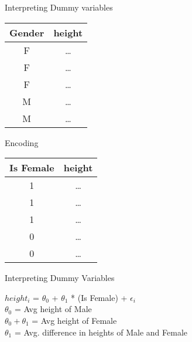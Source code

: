 \documentclass{beamer}
\begin{document}
\begin{frame}{Interpreting Dummy variables}
\begin{center}
\begin{tabular}{c|c}
Gender& height\\
\hline
\hline
F & \dots \\
F & \dots \\
F & \dots \\
M & \dots \\
M & \dots \\
\end{tabular}

\end{center}

\pause Encoding

\begin{center}
\pause \begin{tabular}{c|c}
Is Female& height\\
\hline
\hline
1 & \dots \\
1 & \dots \\
1 & \dots \\
0 & \dots \\
0 & \dots \\
\end{tabular}
\end{center}

\end{frame}

\begin{frame}{Interpreting Dummy Variables}

\pause $height_{i}$ = $\theta_{0}$ + $\theta_{1}$ *  (Is Female) + $\epsilon_{i}$\\
\vspace{1em}
\pause $\theta_{0}$ = Avg height of Male\\
\pause $\theta_{0} + \theta_{1}$ = Avg height of Female\\
\pause $\theta_{1}$ = Avg. difference in heights of Male and Female
\end{frame}
\end{document}
